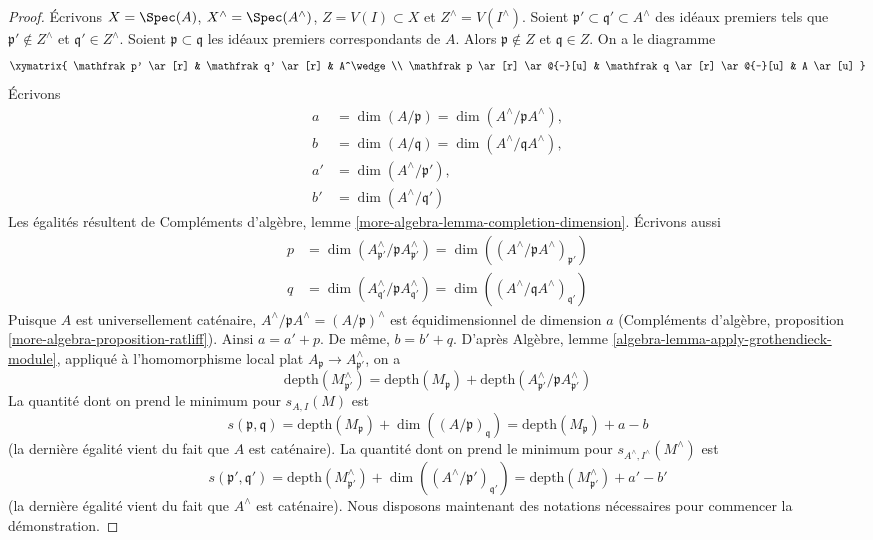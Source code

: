 \begin{proof}
Écrivons $X = \Spec(A)$, $X^\wedge = \Spec(A^\wedge)$, $Z = V(I) \subset X$ et $Z^\wedge = V(I^\wedge)$. Soient $\mathfrak p' \subset \mathfrak q' \subset A^\wedge$ des idéaux premiers tels que $\mathfrak p' \not \in Z^\wedge$ et $\mathfrak q' \in Z^\wedge$. Soient $\mathfrak p \subset \mathfrak q$ les idéaux premiers correspondants de $A$. Alors $\mathfrak p \not \in Z$ et $\mathfrak q \in Z$. On a le diagramme
$$
\xymatrix{
\mathfrak p' \ar[r] & \mathfrak q' \ar[r] & A^\wedge \\
\mathfrak p \ar[r] \ar@{-}[u] &
\mathfrak q \ar[r] \ar@{-}[u] & A \ar[u]
}
$$
Écrivons
\begin{align*}
a & = \dim(A/\mathfrak p) = \dim(A^\wedge/\mathfrak pA^\wedge),\\
b & = \dim(A/\mathfrak q) = \dim(A^\wedge/\mathfrak qA^\wedge),\\
a' & = \dim(A^\wedge/\mathfrak p'),\\
b' & = \dim(A^\wedge/\mathfrak q')
\end{align*}
Les égalités résultent de Compléments d'algèbre, lemme \ref{more-algebra-lemma-completion-dimension}. Écrivons aussi
\begin{align*}
p & = \dim(A^\wedge_{\mathfrak p'}/\mathfrak p A^\wedge_{\mathfrak p'}) =
\dim((A^\wedge/\mathfrak p A^\wedge)_{\mathfrak p'}) \\
q & = \dim(A^\wedge_{\mathfrak q'}/\mathfrak p A^\wedge_{\mathfrak q'}) =
\dim((A^\wedge/\mathfrak q A^\wedge)_{\mathfrak q'})
\end{align*}
Puisque $A$ est universellement caténaire, $A^\wedge/\mathfrak pA^\wedge = (A/\mathfrak p)^\wedge$ est équidimensionnel de dimension $a$ (Compléments d'algèbre, proposition \ref{more-algebra-proposition-ratliff}). Ainsi $a = a' + p$. De même, $b = b' + q$. D'après Algèbre, lemme \ref{algebra-lemma-apply-grothendieck-module}, appliqué à l'homomorphisme local plat $A_\mathfrak p \to A^\wedge_{\mathfrak p'}$, on a
$$
\text{depth}(M^\wedge_{\mathfrak p'})
=
\text{depth}(M_\mathfrak p) +
\text{depth}(A^\wedge_{\mathfrak p'} / \mathfrak p A^\wedge_{\mathfrak p'})
$$
La quantité dont on prend le minimum pour $s_{A, I}(M)$ est
$$
s(\mathfrak p, \mathfrak q) =
\text{depth}(M_\mathfrak p) + \dim((A/\mathfrak p)_\mathfrak q) =
\text{depth}(M_\mathfrak p) + a - b
$$
(la dernière égalité vient du fait que $A$ est caténaire). La quantité dont on prend le minimum pour $s_{A^\wedge, I^\wedge}(M^\wedge)$ est
$$
s(\mathfrak p', \mathfrak q') =
\text{depth}(M^\wedge_{\mathfrak p'}) +
\dim((A^\wedge/\mathfrak p')_{\mathfrak q'}) =
\text{depth}(M^\wedge_{\mathfrak p'}) + a' - b'
$$
(la dernière égalité vient du fait que $A^\wedge$ est caténaire). Nous disposons maintenant des notations nécessaires pour commencer la démonstration.


\end{proof}
